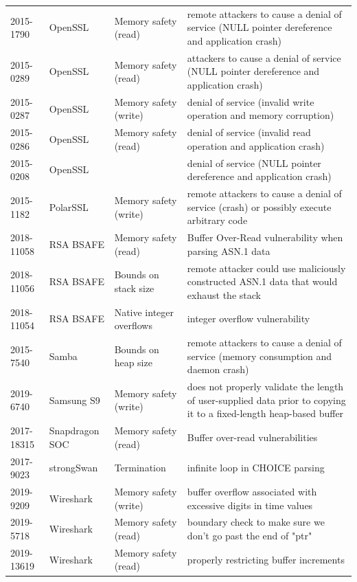 \documentclass[acmsmall,nonacm]{acmart}
\begin{document}
\begin{longtable}{ l l l p{15em} }
2015-1790    & OpenSSL       & Memory safety (read) & remote attackers to cause a denial of service (NULL pointer dereference and application crash) \\ 
2015-0289    & OpenSSL       & Memory safety (read) & attackers to cause a denial of service (NULL pointer dereference and application crash) \\ 
2015-0287    & OpenSSL       & Memory safety (write) & denial of service (invalid write operation and memory corruption) \\ 
2015-0286    & OpenSSL       & Memory safety (read) & denial of service (invalid read operation and application crash) \\ 
2015-0208    & OpenSSL       & & denial of service (NULL pointer dereference and application crash) \\ 
2015-1182    & PolarSSL      & Memory safety (write) & remote attackers to cause a denial of service (crash) or possibly execute arbitrary code \\ 
2018-11058   & RSA BSAFE     & Memory safety (read) & Buffer Over-Read vulnerability when parsing ASN.1 data \\ 
2018-11056   & RSA BSAFE     & Bounds on stack size & remote attacker could use maliciously constructed ASN.1 data that would exhaust the stack \\ 
2018-11054   & RSA BSAFE     & Native integer overflows & integer overflow vulnerability \\ 
2015-7540    & Samba         & Bounds on heap size & remote attackers to cause a denial of service (memory consumption and daemon crash) \\ 
2019-6740    & Samsung S9    & Memory safety (write) & does not properly validate the length of user-supplied data prior to copying it to a fixed-length heap-based buffer \\ 
2017-18315   & Snapdragon SOC & Memory safety (read) & Buffer over-read vulnerabilities \\ 
2017-9023    & strongSwan    & Termination & infinite loop in CHOICE parsing \\ 
2019-9209    & Wireshark     & Memory safety (write) & buffer overflow associated with excessive digits in time values \\ 
2019-5718    & Wireshark     & Memory safety (read) & boundary check to make sure we don't go past the end of "ptr" \\ 
2019-13619   & Wireshark     & Memory safety (read) & properly restricting buffer increments \\ 

\end{longtable}
\end{document}
